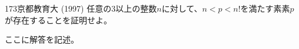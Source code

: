 \begin{prob}{173}{}{京都教育大 (1997)}
 任意の3以上の整数$n$に対して、$n<p<n!$を満たす素素$p$が存在することを証明せよ。
\end{prob}
ここに解答を記述。